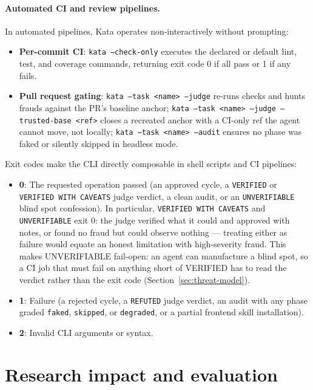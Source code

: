 \documentclass[11pt]{article}
\begin{document}
\paragraph{Automated CI and review pipelines.} In automated pipelines,
Kata operates non-interactively without prompting:
\begin{itemize}
\item \textbf{Per-commit CI}: \texttt{kata --check-only} executes the declared
or default lint, test, and coverage commands, returning exit code 0 if all
pass or 1 if any fails.
\item \textbf{Pull request gating}: \texttt{kata --task <name> --judge}
re-runs checks and hunts frauds against the PR's baseline anchor;
\texttt{kata --task <name> --judge --trusted-base <ref>} closes a recreated
anchor with a CI-only ref the agent cannot move, not locally;
\texttt{kata --task <name> --audit} ensures no phase was faked or silently
skipped in headless mode.
\end{itemize}

Exit codes make the CLI directly composable in shell scripts and CI
pipelines:
\begin{itemize}
\item \textbf{0}: The requested operation passed (an approved cycle, a
\texttt{VERIFIED} or \texttt{VERIFIED WITH CAVEATS} judge verdict, a clean
audit, or an \texttt{UNVERIFIABLE} blind spot confession). In particular,
\texttt{VERIFIED WITH CAVEATS} and \texttt{UNVERIFIABLE} exit 0: the judge
verified what it could and approved with notes, or found no fraud but could
observe nothing --- treating either as failure would equate an honest
limitation with high-severity fraud. This makes UNVERIFIABLE fail-open: an
agent can manufacture a blind spot, so a CI job that must fail on anything
short of VERIFIED has to read the verdict rather than the exit code
(Section~\ref{sec:threat-model}).
\item \textbf{1}: Failure (a rejected cycle, a \texttt{REFUTED} judge
verdict, an audit with any phase graded \texttt{faked}, \texttt{skipped}, or
\texttt{degraded}, or a partial frontend skill installation).
\item \textbf{2}: Invalid CLI arguments or syntax.
\end{itemize}

\section{Research impact and evaluation}
\label{sec:impact}
\end{document}
